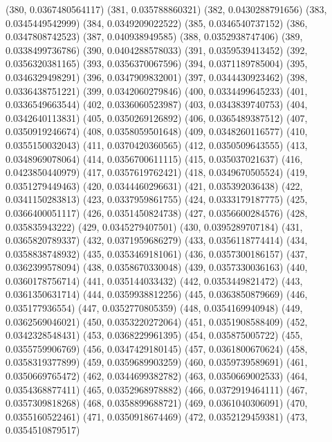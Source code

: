 {					(380, 0.0367480564117)
					(381, 0.035788860321)
					(382, 0.0430288791656)
					(383, 0.0345449542999)
					(384, 0.0349209022522)
					(385, 0.0346540737152)
					(386, 0.0347808742523)
					(387, 0.040938949585)
					(388, 0.0352938747406)
					(389, 0.0338499736786)
					(390, 0.0404288578033)
					(391, 0.0359539413452)
					(392, 0.0356320381165)
					(393, 0.0356370067596)
					(394, 0.0371189785004)
					(395, 0.0346329498291)
					(396, 0.0347909832001)
					(397, 0.0344430923462)
					(398, 0.0336438751221)
					(399, 0.0342060279846)
					(400, 0.0334499645233)
					(401, 0.0336549663544)
					(402, 0.0336060523987)
					(403, 0.0343839740753)
					(404, 0.0342640113831)
					(405, 0.0350269126892)
					(406, 0.0365489387512)
					(407, 0.0350919246674)
					(408, 0.0358059501648)
					(409, 0.0348260116577)
					(410, 0.0355150032043)
					(411, 0.0370420360565)
					(412, 0.0350509643555)
					(413, 0.0348969078064)
					(414, 0.0356700611115)
					(415, 0.035037021637)
					(416, 0.0423850440979)
					(417, 0.0357619762421)
					(418, 0.0349670505524)
					(419, 0.0351279449463)
					(420, 0.0344460296631)
					(421, 0.035392036438)
					(422, 0.0341150283813)
					(423, 0.0337959861755)
					(424, 0.0333179187775)
					(425, 0.0366400051117)
					(426, 0.0351450824738)
					(427, 0.0356600284576)
					(428, 0.035835943222)
					(429, 0.0345279407501)
					(430, 0.0395289707184)
					(431, 0.0365820789337)
					(432, 0.0371959686279)
					(433, 0.0356118774414)
					(434, 0.0358838748932)
					(435, 0.0353469181061)
					(436, 0.0357300186157)
					(437, 0.0362399578094)
					(438, 0.0358670330048)
					(439, 0.0357330036163)
					(440, 0.0360178756714)
					(441, 0.035144033432)
					(442, 0.0353449821472)
					(443, 0.0361350631714)
					(444, 0.0359938812256)
					(445, 0.0363850879669)
					(446, 0.035177936554)
					(447, 0.0352770805359)
					(448, 0.0354169940948)
					(449, 0.0362569046021)
					(450, 0.0353220272064)
					(451, 0.0351908588409)
					(452, 0.0342328548431)
					(453, 0.0368229961395)
					(454, 0.035875005722)
					(455, 0.0355759906769)
					(456, 0.0347429180145)
					(457, 0.0361800670624)
					(458, 0.0358319377899)
					(459, 0.0359689903259)
					(460, 0.0359739589691)
					(461, 0.0350669765472)
					(462, 0.0344699382782)
					(463, 0.0350669002533)
					(464, 0.0354368877411)
					(465, 0.0352968978882)
					(466, 0.0372919464111)
					(467, 0.0357309818268)
					(468, 0.0358899688721)
					(469, 0.0361040306091)
					(470, 0.0355160522461)
					(471, 0.0350918674469)
					(472, 0.0352129459381)
					(473, 0.0354510879517)
}
